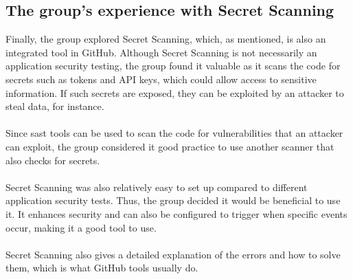 \subsection{The group's experience with Secret Scanning}
Finally, the group explored Secret Scanning, which, as mentioned, is also an integrated tool in GitHub. Although Secret Scanning is not necessarily an application security testing, the group found it valuable as it scans the code for secrets such as tokens and API keys, which could allow access to sensitive information. If such secrets are exposed, they can be exploited by an attacker to steal data, for instance. 
\\~\\
Since \acrshort{sast} tools can be used to scan the code for vulnerabilities that an attacker can exploit, the group considered it good practice to use another scanner that also checks for secrets. 
\\~\\
Secret Scanning was also relatively easy to set up compared to different application security tests. Thus, the group decided it would be beneficial to use it. It enhances security and can also be configured to trigger when specific events occur, making it a good tool to use. 
\\~\\
Secret Scanning also gives a detailed explanation of the errors and how to solve them, which is what GitHub tools usually do. 

